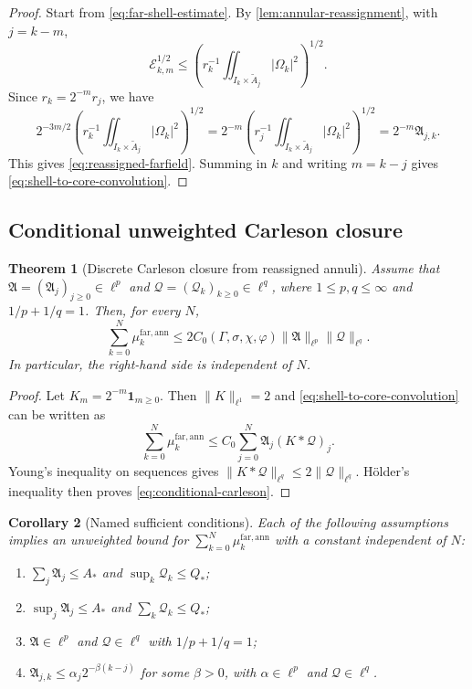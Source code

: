 \documentclass[11pt]{article}
\numberwithin{equation}{section}
\theoremstyle{plain}
\newtheorem{theorem}{Theorem}[section]
\newtheorem{corollary}[theorem]{Corollary}
\theoremstyle{definition}
\theoremstyle{remark}
\begin{document}
\begin{proof}
Start from \eqref{eq:far-shell-estimate}.  By \cref{lem:annular-reassignment}, with $j=k-m$,
\[
\mathcal E_{k,m}^{1/2}
\le
\left(r_k^{-1}\iint_{I_k\times\widetilde A_j}|\Omega_k|^2\right)^{1/2}.
\]
Since $r_k=2^{-m}r_j$, we have
\[
2^{-3m/2}
\left(r_k^{-1}\iint_{I_k\times\widetilde A_j}|\Omega_k|^2\right)^{1/2}
=
2^{-m}
\left(r_j^{-1}\iint_{I_k\times\widetilde A_j}|\Omega_k|^2\right)^{1/2}
=
2^{-m}\mathfrak A_{j,k}.
\]
This gives \eqref{eq:reassigned-farfield}.  Summing in $k$ and writing $m=k-j$ gives \eqref{eq:shell-to-core-convolution}.
\end{proof}

\subsection{Conditional unweighted Carleson closure}

\begin{theorem}[Discrete Carleson closure from reassigned annuli]\label{thm:conditional-carleson}
Assume that $\mathfrak A=(\mathfrak A_j)_{j\ge0}\in\ell^p$ and $\mathcal Q=(\mathcal Q_k)_{k\ge0}\in\ell^q$, where $1\le p,q\le\infty$ and $1/p+1/q=1$.  Then, for every $N$,
\begin{equation}\label{eq:conditional-carleson}
\sum_{k=0}^{N}\mu_k^{\mathrm{far,ann}}
\le
2C_0(\Gamma,\sigma,\chi,\varphi)
\|\mathfrak A\|_{\ell^p}\|\mathcal Q\|_{\ell^q}.
\end{equation}
In particular, the right-hand side is independent of $N$.
\end{theorem}

\begin{proof}
Let $K_m=2^{-m}\mathbf 1_{m\ge0}$.  Then $\|K\|_{\ell^1}=2$ and \eqref{eq:shell-to-core-convolution} can be written as
\[
\sum_{k=0}^{N}\mu_k^{\mathrm{far,ann}}
\le
C_0\sum_{j=0}^{N}\mathfrak A_j(K*\mathcal Q)_j.
\]
Young's inequality on sequences gives $\|K*\mathcal Q\|_{\ell^q}\le2\|\mathcal Q\|_{\ell^q}$.  H\"older's inequality then proves \eqref{eq:conditional-carleson}.
\end{proof}

\begin{corollary}[Named sufficient conditions]\label{cor:named-farfield-closures}
Each of the following assumptions implies an unweighted bound for $\sum_{k=0}^{N}\mu_k^{\mathrm{far,ann}}$ with a constant independent of $N$:
\begin{enumerate}[label=(\roman*)]
\item $\sum_j\mathfrak A_j\le A_*$ and $\sup_k\mathcal Q_k\le Q_*$;
\item $\sup_j\mathfrak A_j\le A_*$ and $\sum_k\mathcal Q_k\le Q_*$;
\item $\mathfrak A\in\ell^p$ and $\mathcal Q\in\ell^q$ with $1/p+1/q=1$;
\item $\mathfrak A_{j,k}\le \alpha_j2^{-\beta(k-j)}$ for some $\beta>0$, with $\alpha\in\ell^p$ and $\mathcal Q\in\ell^q$.
\end{enumerate}
\end{corollary}
\end{document}
